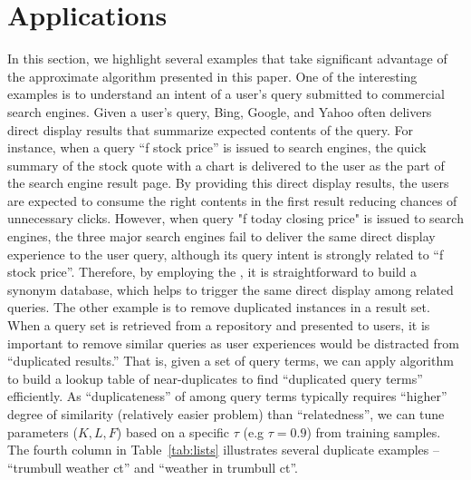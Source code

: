 \section{Applications}
In this section, we highlight several examples that take significant advantage of  the approximate \dflipb algorithm presented in this paper.
One of the interesting examples is to understand an intent of a user's query submitted to commercial search engines. Given a user's query,
Bing, Google, and Yahoo often delivers direct display results that summarize expected contents of the query. 
For instance, when a query ``f stock price'' is issued  to search engines, the quick summary of the stock quote with a chart is delivered 
to the user as the part of the search engine result page. By providing this direct display results, the users are expected to consume the right contents
in the first result reducing chances of unnecessary clicks. However, when query "f today closing price" is issued to search engines, the three major search engines 
fail to deliver the same direct display experience to the user query, although its query intent is strongly related to ``f stock price''. 
Therefore, by employing the \dflip, it is straightforward to build a synonym database, which helps to trigger the same direct display among related queries.
The other example is to remove duplicated instances in a result set. 
When a query set is retrieved from a repository and presented to users, it is important to remove similar queries as user experiences would be distracted from ``duplicated results.'' 
That is, given a set of query terms, we can apply  \dflipb algorithm to build a lookup table of near-duplicates 
to find ``duplicated query terms'' efficiently. As ``duplicateness'' of among query terms typically requires ``higher'' degree of similarity (relatively easier problem) than ``relatedness'', we can tune parameters ($K, L, F$) based on a specific $\tau$ (e.g $\tau=0.9$) from training samples.  The fourth column in Table~\ref{tab:lists} illustrates several duplicate examples -- ``trumbull weather ct'' and ``weather in trumbull ct''.
